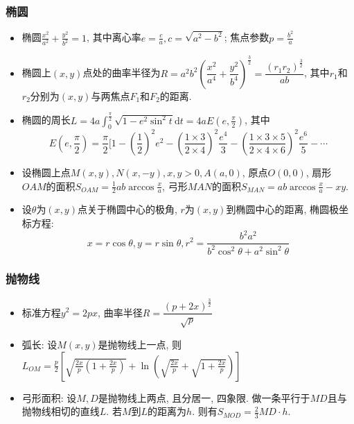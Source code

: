 \documentclass[landscape, twocolumn, 8pt, a4paper, twoside]{extarticle}
\begin{document}
    \subsubsection{椭圆}
    \begin{itemize}
    \item 椭圆$\frac{x^2}{a^2} + \frac{y^2}{b^2} = 1$, 其中离心率$e = \frac{c}{a}, c = \sqrt{a^2 - b^2}$; 焦点参数$p = \frac{b^2}{a}$
    \item 椭圆上$(x, y)$点处的曲率半径为$R = a^2 b^2 (\dfrac{x^2}{a^4} + \dfrac{y^2}{b^4})^\frac{3}{2} = \dfrac{(r_1 r_2)^\frac{3}{2}}{ab}$, 其中$r_1$和$r_2$分别为$(x, y)$与两焦点$F_1$和$F_2$的距离. %
    \item 椭圆的周长$L = 4a \int_0^{\frac{\pi}{2}} \sqrt{1 - e^2 \sin^2 t } \textrm{d} t = 4a E(e, \frac{\pi}{2})$, 其中
    \[ E(e, \frac{\pi}{2}) = \frac{\pi}{2} [ 1 - (\frac{1}{2})^2 e^2 - (\frac{1 \times 3}{2 \times 4})^2 \frac{e^4}{3} - (\frac{1 \times 3 \times 5}{2 \times 4 \times 6})^2 \frac{e^6}{5} - \cdots\]
    \item 设椭圆上点$M(x, y), N(x, -y), x, y > 0, A(a, 0)$, 原点$O(0, 0)$, 扇形$OAM$的面积$S_{OAM} = \frac{1}{2} ab \arccos{\frac{x}{a}}$, 弓形$MAN$的面积$S_{MAN} = ab \arccos{\frac{x}{a}} - xy$.
    \item 设$\theta$为$(x, y)$点关于椭圆中心的极角, $r$为$(x, y)$到椭圆中心的距离, 椭圆极坐标方程:
    \[ x = r \cos \theta, y = r \sin \theta, r^2 = \frac{b^2 a^2}{b^2 \cos^2 \theta + a^2 \sin^2 \theta}\]
  \end{itemize}
  
    \subsubsection{抛物线}
    \begin{itemize}
    \item 标准方程$y^2 = 2px$, 曲率半径$ R = \dfrac{(p + 2x)^{\frac{3}{2} }}{\sqrt{p}}$
    \item 弧长: 设$M(x, y)$是抛物线上一点, 则$L_{OM} = \frac{p}{2} [ \sqrt{\frac{2x}{p}(1 + \frac{2x}{p})} + \ln(\sqrt{\frac{2x}{p}} + \sqrt{1 + \frac{2x}{p}})]$
    \item 弓形面积: 设$M, D$是抛物线上两点, 且分居一, 四象限. 做一条平行于$MD$且与抛物线相切的直线$L$. 若$M$到$L$的距离为$h$. 则有$S_{MOD} = \frac{2}{3}MD \cdot h$.
    \end{itemize}
\end{document}
